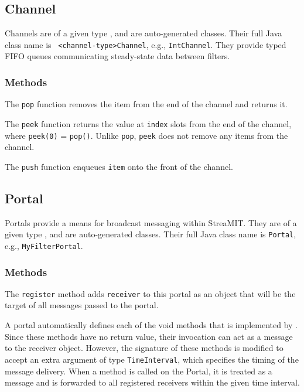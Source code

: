 \subsection{Channel}

Channels are of a given type {\tt <channel-type>}, and are
auto-generated classes.  Their full Java class name is {\tt
<channel-type>Channel}, e.g., {\tt IntChannel}.  They provide typed
FIFO queues communicating steady-state data between filters.

\subsubsection{Methods}

  The {\tt pop} function removes the item from the end of the channel and returns it.

  The {\tt peek} function returns the value at {\tt index} slots from the end of the channel, where {\tt peek(0)} = {\tt pop()}.  Unlike {\tt pop}, {\tt peek} does not remove any items from the channel.

  The {\tt push} function enqueues {\tt item} onto the front of the channel.

\subsection{Portal}

Portals provide a means for broadcast messaging within StreaMIT.  They
are of a given type {\tt <portal-type>}, and are auto-generated
classes.  Their full Java class name is {\tt <portal-type>Portal},
e.g., {\tt MyFilterPortal}.

\subsubsection{Methods}

  The {\tt register} method adds {\tt receiver} to this portal as an object that will be the target of all messages passed to the portal.

  A portal automatically defines each of the void methods that is implemented by {\tt <portal-type>}.  Since these methods have no return value, their invocation can act as a message to the receiver object.  However, the signature of these methods is modified to accept an extra argument of type {\tt TimeInterval}, which specifies the timing of the message delivery.  When a method is called on the Portal, it is treated as a message and is forwarded to all registered receivers within the given time interval.

